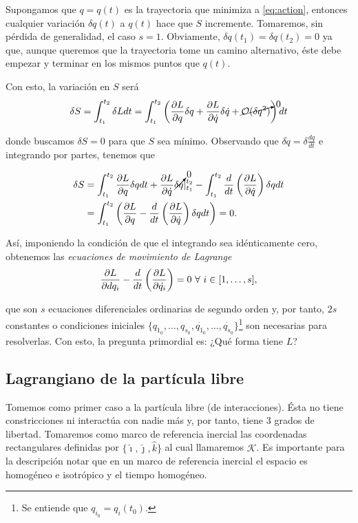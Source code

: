 Supongamos que $q = q(t)$ es la trayectoria que minimiza a \ref{eq:action}, entonces cualquier variación $\delta q(t)$ a $q(t)$ hace que $S$ incremente. Tomaremos, sin pérdida de generalidad, el caso $s = 1$. Obviamente, $\delta q(t_1) = \delta q(t_2) = 0$ ya que, aunque queremos que la trayectoria tome un camino alternativo, éste debe empezar y terminar en los mismos puntos que $q(t)$. 

Con esto, la variación en $S$ será 
\begin{align*}
 \delta S = \int_{t_1}^{t_2} \delta L dt = \int_{t_1}^{t_2} \left( \frac{\partial L}{\partial q} \delta q + \frac{\partial L}{\partial  \dot{q} } \delta \dot{q} + \cancelto{0}{\mathcal{O}(\delta q^2)} \right) dt
\end{align*}

donde buscamos $\delta S = 0$ para que $S$ sea mínimo. Observando que $\delta \dot{q} = \delta \frac{dq}{dt}$ e integrando por partes, tenemos que 

\begin{align*}
 \delta S &= \int_{t_1}^{t_2} \frac{\partial L}{\partial q} \delta q dt + \frac{\partial L}{\partial \dot{q}} \cancelto{0}{\delta q} \rvert_{t_1}^{t_2} - \int_{t_1}^{t_2} \frac{d}{dt} \left( \frac{\partial L}{\partial \dot{q}} \right) \delta q dt\\ 
 &= \int_{t_1}^{t_2} \left( \frac{\partial L}{\partial q} - \frac{d}{dt} \left( \frac{\partial L}{\partial  \dot{q} } \right) \delta q dt \right) = 0.
\end{align*}

Así, imponiendo la condición de que el integrando sea idénticamente cero, obtenemos las \textit{ecuaciones de movimiento de Lagrange}
\begin{equation}
 \frac{\partial L}{\partial d q_i} - \frac{d}{dt} \left( \frac{\partial L}{\partial  \dot{q_i} } \right) = 0 \ \forall \ i \in [1, \ldots, s],
 \label{eq:lagrange_equations}
\end{equation}

que son $s$ ecuaciones diferenciales ordinarias de segundo orden y, por tanto, $2s$ constantes o condiciones iniciales $\{ q_{1_0}, \ldots, q_{s_0}, \dot{q_{1_0}}, \ldots, \dot{q_{s_0}} \}$\footnote{Se entiende que $q_{i_0} = q_i(t_0)$.} son necesarias para resolverlas. Con esto, la pregunta primordial es: ¿Qué forma tiene $L$?

\subsection{Lagrangiano de la partícula libre}

Tomemos como primer caso a la partícula libre (de interacciones). Ésta no tiene constricciones ni interactúa con nadie más y, por tanto, tiene 3 grados de libertad. Tomaremos como marco de referencia inercial las coordenadas rectangulares definidas por $\{ \hat{\imath}, \hat{\jmath}, \hat{k} \}$ al cual llamaremos $\mathcal{K}$. Es importante para la descripción notar que en un marco de referencia inercial el espacio es homogéneo e isotrópico y el tiempo homogéneo. 

